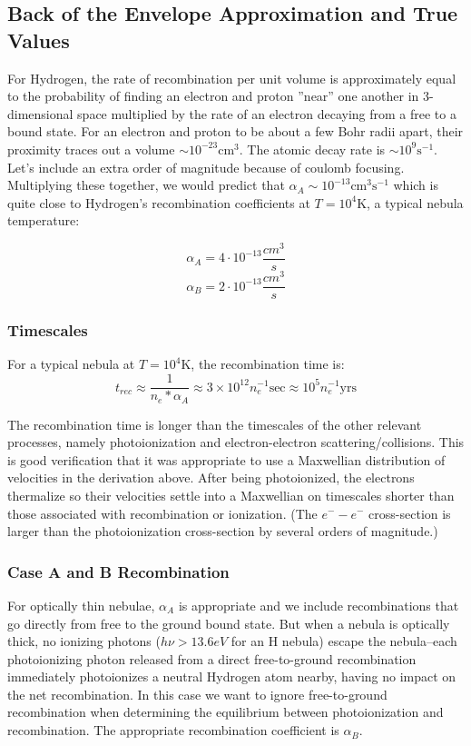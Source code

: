 \documentclass{article}
\def\e#1{\cdot10^{#1}}
\begin{document}
\subsection*{Back of the Envelope Approximation and True Values}
For Hydrogen, the rate of recombination per unit volume is approximately equal to the probability of finding an electron and proton ''near'' one another in 3-dimensional space multiplied by the rate of an electron decaying from a free to a bound state. For an electron and proton to be about a few Bohr radii apart, their proximity traces out a volume $\sim 10^{-23} \textrm{cm}^3$. The atomic decay rate is $\sim 10^9 \textrm{s}^{-1}$. Let's include an extra order of magnitude because of coulomb focusing. Multiplying these together, we would predict that $\alpha_A \sim 10^{-13} \textrm{cm}^3 \textrm{s}^{-1}$ which is quite close to Hydrogen's recombination coefficients at $T=10^4 \textrm{K}$, a typical nebula temperature:

$$\alpha_A=4\e{-13}\frac{cm^3}{ s}$$
$$\alpha_B=2\e{-13}\frac{cm^3}{ s}$$

\subsubsection{Timescales}
For a typical nebula at $T=10^4 \textrm{K}$, the recombination time is:
$$t_{rec} \approx \frac{1 }{ n_e * \alpha_A} \approx 3 \times 10^{12} n_e^{-1} \textrm{sec} \approx 10^{5} n_e^{-1} \textrm{yrs} $$

The recombination time is longer than the timescales of the other relevant processes, namely photoionization and electron-electron scattering/collisions. This is good verification that it was appropriate to use a Maxwellian distribution of velocities in the derivation above. After being photoionized, the electrons thermalize so their velocities settle into a Maxwellian on timescales shorter than those associated with recombination or ionization. (The $e^--e^-$ cross-section is larger than the photoionization cross-section by several orders of magnitude.)

\subsubsection{Case A and B Recombination}
For optically thin nebulae, $\alpha_A$ is appropriate and we include recombinations that go directly from free to the ground bound state. But when a nebula is optically thick, no ionizing photons ($h \nu > 13.6 eV$ for an H nebula) escape the nebula--each photoionizing photon released from a direct free-to-ground recombination immediately photoionizes a neutral Hydrogen atom nearby, having no impact on the net recombination. In this case we want to ignore free-to-ground recombination when determining the equilibrium between photoionization and recombination. The appropriate recombination coefficient is $\alpha_B$.
\end{document}

